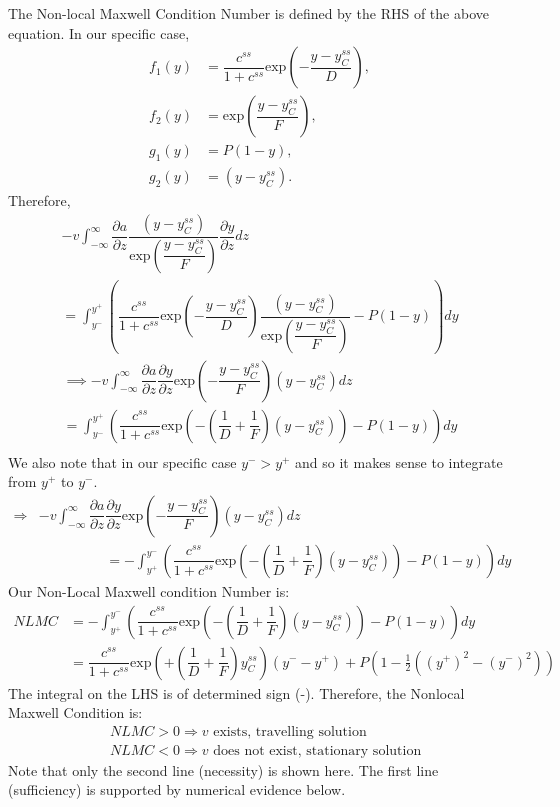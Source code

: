 The Non-local Maxwell Condition Number is defined by the RHS of the above equation. In our specific case,
\begin{align}
f_1(y) &=  \dfrac{c^{ss}}{1+c^{ss}} \mbox{exp}\left(-\dfrac{y-y_C^{ss}}{D}\right),\\
f_2(y) &= \mbox{exp} \left(\dfrac{y-y_C^{ss}}{F} \right),\\
g_1(y) &=  P (1-y), \\
 g_2(y) &= (y - y_C^{ss}).
\end{align}
Therefore, 
\begin{multline}
-v  \int_ {- \infty}^{\infty}  \dfrac{\partial a}{ \partial z} \dfrac{(y - y_C^{ss})}{ \mbox{exp} \left(\dfrac{y-y_C^{ss}}{F} \right)} \dfrac{\partial y}{\partial z} dz \\
= \int_ {y^{-}}^{y^{+}} \left( \dfrac{c^{ss}}{1+c^{ss}} \mbox{exp}\left(-\dfrac{y-y_C^{ss}}{D}\right) \dfrac{(y - y_C^{ss})}{ \mbox{exp} \left(\dfrac{y-y_C^{ss}}{F} \right)}  -   P (1-y) \right) dy
\end{multline}
\begin{multline}
\implies -v  \int_ {- \infty}^{\infty}  \dfrac{\partial a}{ \partial z}\dfrac{\partial y}{\partial z} \mbox{exp} \left(-\dfrac{y-y_C^{ss}}{F} \right)(y - y_C^{ss}) dz\\
= \int_ {y^{-}}^{y^{+}}  \left( \dfrac{c^{ss}}{1+c^{ss}} \mbox{exp}\left( -\left( \dfrac{1}{D} + \dfrac{1}{F} \right) (y-y_C^{ss})\right)  -   P (1-y) \right) dy\\
\end{multline}
We also note that in our specific case $y^- > y^+$ and so it makes sense to integrate from $y^+$ to $ y^-$.
\begin{align*}
\Rightarrow & -v  \int_ {- \infty}^{\infty}  \dfrac{\partial a}{ \partial z}\dfrac{\partial y}{\partial z} \mbox{exp} \left(-\dfrac{y-y_C^{ss}}{F} \right)(y - y_C^{ss}) dz\\
& \hspace{2cm}= - \int_ {y^{+}}^{y^{-}}  \left( \dfrac{c^{ss}}{1+c^{ss}} \mbox{exp}\left( -\left( \dfrac{1}{D} + \dfrac{1}{F} \right) (y-y_C^{ss})\right)  -   P (1-y) \right) dy
\end{align*}
Our Non-Local Maxwell condition Number is:
\begin{align}
NLMC &= -\int_ {y^{+}}^{y^{-}}  \left( \dfrac{c^{ss}}{1+c^{ss}} \mbox{exp}\left( -\left( \dfrac{1}{D} + \dfrac{1}{F} \right) (y-y_C^{ss})\right)  -   P (1-y) \right) dy \\
 &= \dfrac{c^{ss}}{1+c^{ss}}  \mbox{exp}\left( +\left( \dfrac{1}{D} + \dfrac{1}{F} \right)y_C^{ss}  \right) \left( y^--y^+ \right) + P\left( 1 - \frac{1}{2}\left( \left(y^+\right)^2-\left(y^-\right)^2\right)\right)
\end{align}
The integral on the LHS is of determined sign (-).  Therefore, the Nonlocal Maxwell Condition is:
\begin{align*}
& NLMC >0 \Rightarrow v \text{ exists, travelling solution}\\
& NLMC <0 \Rightarrow v \text{ does not exist, stationary solution}
\end{align*}
Note that only the second line (necessity) is shown here. The first line (sufficiency) is supported by numerical evidence below.

